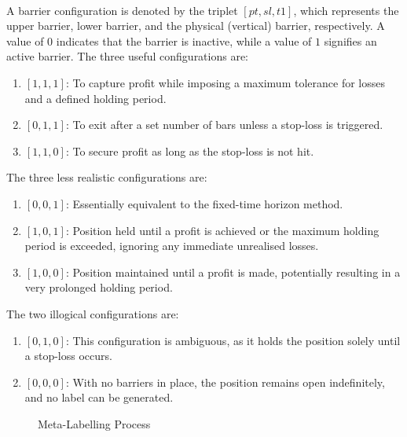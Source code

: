 \begin{remark} \\
A barrier configuration is denoted by the triplet $[pt, sl, t1]$, which represents the upper barrier, lower barrier, and the physical (vertical) barrier, respectively. A value of $0$ indicates that the barrier is inactive, while a value of $1$ signifies an active barrier. The three useful configurations are:
\begin{enumerate}[label=\roman*.]
\setlength{\itemsep}{0pt}
\item $[1,1,1]$: To capture profit while imposing a maximum tolerance for losses and a defined holding period.
\item $[0,1,1]$: To exit after a set number of bars unless a stop-loss is triggered.
\item $[1,1,0]$: To secure profit as long as the stop-loss is not hit.
\end{enumerate}
The three less realistic configurations are:
\begin{enumerate}[label=\roman*.]
\setlength{\itemsep}{0pt}
\item $[0,0,1]$: Essentially equivalent to the fixed-time horizon method.
\item $[1,0,1]$: Position held until a profit is achieved or the maximum holding period is exceeded, ignoring any immediate unrealised losses.
\item $[1,0,0]$: Position maintained until a profit is made, potentially resulting in a very prolonged holding period.
\end{enumerate}
The two illogical configurations are:
\begin{enumerate}[label=\roman*.]
\setlength{\itemsep}{0pt}
\item $[0,1,0]$: This configuration is ambiguous, as it holds the position solely until a stop-loss occurs.
\item $[0,0,0]$: With no barriers in place, the position remains open indefinitely, and no label can be generated.
\end{enumerate}
\end{remark}

\begin{figure}[H]
\centering
\scalebox{0.75}{}
\caption{Meta-Labelling Process}
\end{figure}

